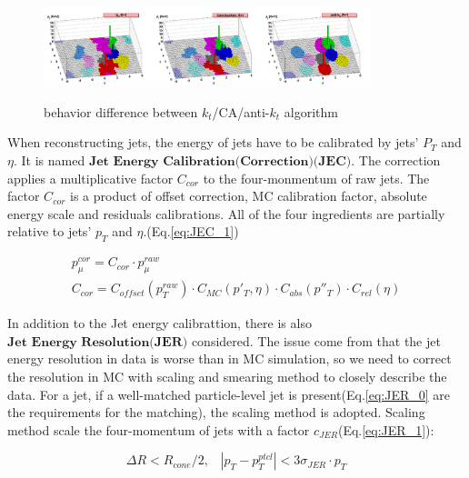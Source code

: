 		\begin{figure}[H]
		\centering{}
	    	\includegraphics[width=0.85\textwidth]{Figures/PhysObj/3type_jetreco.pdf}\\
		\caption{behavior difference between $k_t$/CA/anti-$k_t$ algorithm \cite{Atkin_2015}}
		\label{PhysObj:fig:3type_jetreco}
		\end{figure}
		\FloatBarrier

		When reconstructing jets, the energy of jets have to be calibrated by jets' $P_T$ and $\eta$. It is named $\textbf{Jet Energy Calibration(Correction)(JEC)}$\cite{collaboration_2011_JEC}. The correction applies a multiplicative factor $C_{cor}$ to the four-monmentum of raw jets. The factor $C_{cor}$ is a product of offset correction, MC calibration factor, absolute energy scale and residuals calibrations. All of the four ingredients are partially relative to jets' $p_T$ and $\eta$.(Eq.\ref{eq:JEC_1})

		\begin{equation}
		\begin{split}
		p_{\mu}^{cor} = C_{cor} \cdot p_{\mu}^{raw} \; \; \; \; \; \; \; \; \; \; \; \; \; \; \; \; \; \; \; \; \; \; \; \; \; \; \; \; \; \; \; \; \; \; \; \; \; \; \; \; \; \; \; \; \; \; \; \; \\
		C_{cor} = C_{offset}(p_T^{raw}) \cdot C_{MC}(p'_T,\eta) \cdot C_{abs}(p''_T) \cdot C_{rel}(\eta)
		\end{split}
		\label{eq:JEC_1}
		\end{equation}
		\FloatBarrier

		In addition to the Jet energy calibrattion, there is also $\textbf{Jet Energy Resolution(JER)}$ considered\cite{JER_twiki}. The issue come from that the jet energy resolution in data is worse than in MC simulation, so we need to correct the resolution in MC with scaling and smearing method to closely describe the data. For a jet, if a well-matched particle-level jet is present(Eq.\ref{eq:JER_0} are the requirements for the matching), the scaling method is adopted. Scaling method scale the four-momentum of jets with a factor $c_{JER}$(Eq.\ref{eq:JER_1}):

		\begin{equation}
		\Delta R < R_{cone}/2, \; \; \; |p_T-p_T^{ptcl}| < 3 \sigma_{JER} \cdot p_T
		\label{eq:JER_0}
		\end{equation}
		\FloatBarrier

